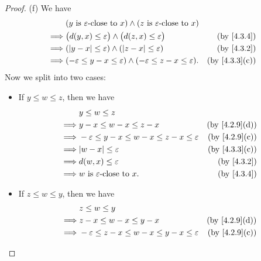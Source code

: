 \begin{proof}{(f)}
  We have
  \begin{align*}
             & (y \text{ is } \varepsilon\text{-close to } x) \land (z \text{ is } \varepsilon\text{-close to } x)                               \\
    \implies & \big(d(y, x) \leq \varepsilon\big) \land \big(d(z, x) \leq \varepsilon\big)                         & \text{(by \cref{4.3.4})}    \\
    \implies & (\abs{y - x} \leq \varepsilon) \land (\abs{z - x} \leq \varepsilon)                                 & \text{(by \cref{4.3.2})}    \\
    \implies & (-\varepsilon \leq y - x \leq \varepsilon) \land (-\varepsilon \leq z - x \leq \varepsilon).        & \text{(by \cref{4.3.3}(c))}
  \end{align*}
  Now we split into two cases:
  \begin{itemize}
    \item If \(y \leq w \leq z\), then we have
          \begin{align*}
                     & y \leq w \leq z                                                                              \\
            \implies & y - x \leq w - x \leq z - x                                    & \text{(by \cref{4.2.9}(d))} \\
            \implies & -\varepsilon \leq y - x \leq w - x \leq z - x \leq \varepsilon & \text{(by \cref{4.2.9}(c))} \\
            \implies & \abs{w - x} \leq \varepsilon                                   & \text{(by \cref{4.3.3}(c))} \\
            \implies & d(w, x) \leq \varepsilon                                       & \text{(by \cref{4.3.2})}    \\
            \implies & w \text{ is } \varepsilon\text{-close to } x.                  & \text{(by \cref{4.3.4})}
          \end{align*}
    \item If \(z \leq w \leq y\), then we have
          \begin{align*}
                     & z \leq w \leq y                                                                              \\
            \implies & z - x \leq w - x \leq y - x                                    & \text{(by \cref{4.2.9}(d))} \\
            \implies & -\varepsilon \leq z - x \leq w - x \leq y - x \leq \varepsilon & \text{(by \cref{4.2.9}(c))} \\

\end{align*}
\end{itemize}
\end{proof}
